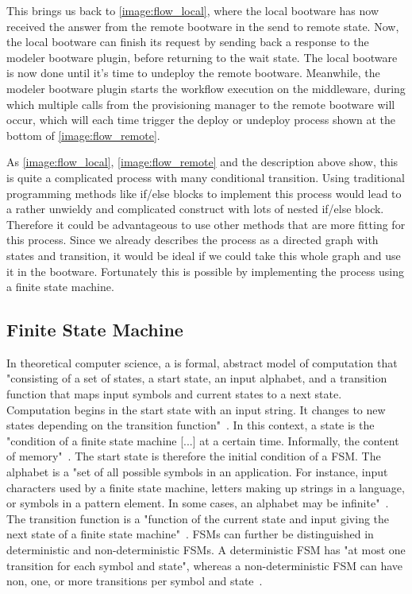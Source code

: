 This brings us back to \autoref{image:flow_local}, where the local bootware has now received the answer from the remote bootware in the send to remote state.
Now, the local bootware can finish its request by sending back a response to the modeler bootware plugin, before returning to the wait state.
The local bootware is now done until it's time to undeploy the remote bootware.
Meanwhile, the modeler bootware plugin starts the workflow execution on the middleware, during which multiple calls from the provisioning manager to the remote bootware will occur, which will each time trigger the deploy or undeploy process shown at the bottom of \autoref{image:flow_remote}.

As \autoref{image:flow_local}, \autoref{image:flow_remote} and the description above show, this is quite a complicated process with many conditional transition.
Using traditional programming methods like if/else blocks to implement this process would lead to a rather unwieldy and complicated construct with lots of nested if/else block.
Therefore it could be advantageous to use other methods that are more fitting for this process.
Since we already describes the process as a directed graph with states and transition, it would be ideal if we could take this whole graph and use it in the bootware.
Fortunately this is possible by implementing the process using a finite state machine.

\subsection{Finite State Machine}

In theoretical computer science, a  is formal, abstract model of computation that "consisting of a set of states, a start state, an input alphabet, and a transition function that maps input symbols and current states to a next state. Computation begins in the start state with an input string. It changes to new states depending on the transition function"~\autocite{fsm}.
In this context, a state is the "condition of a finite state machine [...] at a certain time. Informally, the content of memory"~\autocite{state}.
The start state is therefore the initial condition of a FSM.
The alphabet is a "set of all possible symbols in an application. For instance, input characters used by a finite state machine, letters making up strings in a language, or symbols in a pattern element. In some cases, an alphabet may be infinite"~\autocite{alphabet}.
The transition function is a "function of the current state and input giving the next state of a finite state machine"~\autocite{transitionfn}.
FSMs can further be distinguished in deterministic and non-deterministic FSMs.
A deterministic FSM has "at most one transition for each symbol and state", whereas a non-deterministic FSM can have non, one, or more transitions per symbol and state~\autocite{deterministic}.

